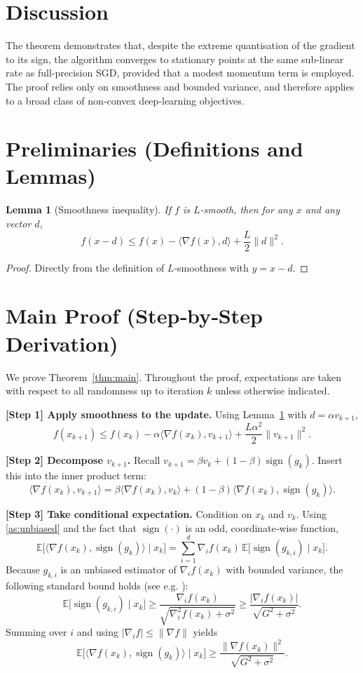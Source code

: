 \documentclass{article}
\newtheorem{lemma}{Lemma}
\newcommand{\sign}{\operatorname{sign}}
\newcommand{\E}{\mathbb{E}}
\begin{document}
\section*{Discussion}
The theorem demonstrates that, despite the extreme quantisation of the gradient to its sign, the algorithm converges to stationary points at the same sub‑linear rate as full‑precision SGD, provided that a modest momentum term is employed. The proof relies only on smoothness and bounded variance, and therefore applies to a broad class of non‑convex deep‑learning objectives.

\section*{Preliminaries (Definitions and Lemmas)}
\begin{lemma}[Smoothness inequality]\label{lem:smooth}
If $f$ is $L$‑smooth, then for any $x$ and any vector $d$,
\[
f(x-d)\le f(x)-\langle\nabla f(x),d\rangle+\frac{L}{2}\|d\|^{2}.
\]
\end{lemma}
\begin{proof}
Directly from the definition of $L$‑smoothness with $y=x-d$.
\end{proof}

\section*{Main Proof (Step‑by‑Step Derivation)}
We prove Theorem~\ref{thm:main}.  Throughout the proof, expectations are taken with respect to all randomness up to iteration $k$ unless otherwise indicated.

\bigskip
\noindent\textbf{[Step 1] Apply smoothness to the update.}  
Using Lemma~\ref{lem:smooth} with $d=\alpha v_{k+1}$,
\[
f(x_{k+1})\le f(x_{k})-\alpha\langle\nabla f(x_{k}),v_{k+1}\rangle+\frac{L\alpha^{2}}{2}\|v_{k+1}\|^{2}.
\tag{2}
\]

\noindent\textbf{[Step 2] Decompose $v_{k+1}$.}  
Recall $v_{k+1}= \beta v_{k} + (1-\beta)\sign(g_{k})$.  
Insert this into the inner product term:
\[
\langle\nabla f(x_{k}),v_{k+1}\rangle
= \beta\langle\nabla f(x_{k}),v_{k}\rangle
+ (1-\beta)\langle\nabla f(x_{k}),\sign(g_{k})\rangle .
\tag{3}
\]

\noindent\textbf{[Step 3] Take conditional expectation.}  
Condition on $x_{k}$ and $v_{k}$.
Using \ref{as:unbiased} and the fact that $\sign(\cdot)$ is an odd, coordinate‑wise function,
\[
\E\!\bigl[\langle\nabla f(x_{k}),\sign(g_{k})\rangle\mid x_{k}\bigr]
= \sum_{i=1}^{d}\nabla_{i}f(x_{k})\,\E\!\bigl[\sign(g_{k,i})\mid x_{k}\bigr].
\]
Because $g_{k,i}$ is an unbiased estimator of $\nabla_{i}f(x_{k})$ with bounded variance, the following standard bound holds (see e.g. \cite{signsgd}):
\[
\E\!\bigl[\sign(g_{k,i})\mid x_{k}\bigr]\ge \frac{\nabla_{i}f(x_{k})}{\sqrt{\nabla_{i}^{2}f(x_{k})+\sigma^{2}}}
\ge \frac{|\nabla_{i}f(x_{k})|}{\sqrt{G^{2}+\sigma^{2}}}.
\tag{4}
\]
Summing over $i$ and using $|\nabla_{i}f|\le\|\nabla f\|$ yields
\[
\E\!\bigl[\langle\nabla f(x_{k}),\sign(g_{k})\rangle\mid x_{k}\bigr]
\ge \frac{\|\nabla f(x_{k})\|^{2}}{\sqrt{G^{2}+\sigma^{2}}}.
\tag{5}
\]
\end{document}
